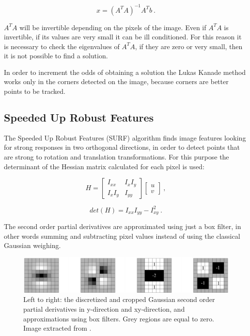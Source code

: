 $$
x = (A^T A)^{-1} A^T b \ .
$$


\noindent $A^T A$ will be invertible depending on the pixels of the image. Even if $A^T A $ is invertible, 
if its values are very small it can be ill conditioned. For this reason it is necessary to check the eigenvalues of $A^T A$, if they are zero or very small, then it is not possible to find a solution.

In order to increment the odds of obtaining a solution the Lukas Kanade method works only in the corners detected on the image, because corners are better points to be tracked.

\subsection{Speeded Up Robust Features}
\label{sec:surf}

The Speeded Up Robust Features (SURF) algorithm finds image features looking for strong responses in two orthogonal directions, in order to detect points that are strong to rotation and translation transformations. For this purpose the determinant of the Hessian matrix calculated for each pixel is used:


$$
H = \begin{bmatrix} I_{xx} & I_x I_y \\ I_x I_y & I_{yy} \end{bmatrix} \begin{bmatrix} u \\ v \end{bmatrix} \ ,
$$

$$
det(H) = I_{xx} I_{yy} - I_{xy}^2\ .
$$


\noindent The second order partial derivatives are approximated using just a box filter, in other words 
summing and subtracting pixel values instead of using the classical Gaussian weighing. 

\begin{figure}[!h]
\begin{center}
\includegraphics[scale=0.35]{images/surf_mask}
\caption{Left to right: the discretized and cropped Gaussian second order partial derivatives 
in y-direction and xy-direction, and approximations using box filters. 
Grey regions are equal to zero. Image extracted from \cite{Bay06surf}.}
\end{center}
\end{figure}

